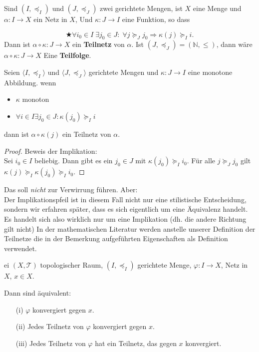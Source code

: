 {
Sind $(I, \preceq_I)$ und $(J, \preceq_J)$ zwei gerichtete Mengen,
ist $X$ eine Menge und $\alpha : I \to X$ ein Netz in $X$, 
Und $\kappa : J \to I$ eine Funktion, so dass
 
$$
\bigstar
\forall i_0 \in I \; \exists j_0 \in J : \; \forall j \succeq_J j_0
\Rightarrow \kappa(j) \succeq_I i .
$$
Dann ist $\alpha \circ \kappa : J \to X$ ein \textbf{Teilnetz} von $\alpha$.
Ist $(J, \preceq_J) = (\mathbb{N}, \leq)$, 
dann wäre $\alpha \circ \kappa : J \to X$ Eine \textbf{Teilfolge}.
}
\nt
{ 
    Seien $\langle I, \preceq_I \rangle$ und $\langle J, \preceq_J \rangle$ 
    gerichtete Mengen und $\kappa : J \to I$ eine monotone Abbildung.
    wenn 
    \begin{itemize}
        \item $\kappa$ monoton
        \item $\forall i \in I \exists j_0 \in J: \kappa(j_0) \succeq_I i$
    \end{itemize}
    dann ist $\alpha \circ \kappa(j) $ ein Teilnetz von $\alpha$.

    \begin{proof}{Beweis der Implikation:}\\
        Sei $i_0 \in I$ beliebig. Dann gibt es ein $j_0 \in J$ mit 
        $\kappa(j_0) \succeq_I i_0$. Für alle $j \succeq_J j_0$ gilt
        $\kappa(j) \succeq_I \kappa(j_0) \succeq_I i_0$.
    \end{proof}
}

Das soll \emph{nicht} zur Verwirrung führen. Aber:\\
Der Implikationspfeil ist in diesem Fall nicht nur eine stilistische Entscheidung,
sondern wir erfahren später, dass es sich eigentlich um eine Äquivalenz handelt. 
Es handelt sich also wirklich nur um eine Implikation (dh. die andere Richtung
gilt nicht) 
In der mathematischen Literatur werden anstelle unserer Definition der Teilnetze
die in der Bemerkung aufgeführten Eigenschaften als Definition verwendet.

\thm{}
{
    ei $(X, \mathcal{T})$ topologischer Raum, $(I, \preceq_I)$ gerichtete Menge,  
$\varphi : I \to X$, Netz in $X$, $x \in X$.  

Dann sind äquivalent:

\begin{enumerate}
\item[(i)] $\varphi$ konvergiert gegen $x$.
\item[(ii)] Jedes Teilnetz von $\varphi$ konvergiert gegen $x$.
\item[(iii)] Jedes Teilnetz von $\varphi$ hat ein Teilnetz, das gegen $x$ konvergiert.
\end{enumerate}
}

